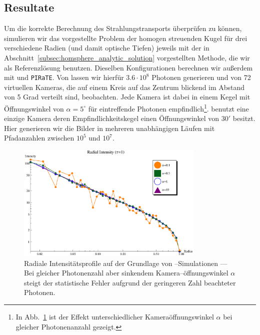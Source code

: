 	\subsection{Resultate}
	Um die korrekte Berechnung des Strahlungstransports überprüfen zu können, simulieren wir das vorgestellte Problem der homogen streuenden Kugel für drei verschiedene Radien (und damit optische Tiefen) jeweils mit der in Abschnitt~\ref{subsec:homsphere_analytic_solution} vorgestellten Methode, die wir als Referenzlösung benutzen. Dieselben Konfigurationen berechnen wir außerdem mit \mctd und \texttt{PIRaTE}. Von \mctd lassen wir hierfür $3.6\cdot10^8$ Photonen generieren und von 72 virtuellen Kameras, die auf einem Kreis auf das Zentrum blickend im Abstand von 5 Grad verteilt sind, beobachten. Jede Kamera ist dabei in einem Kegel mit Öffnungswinkel von $\alpha=5^\circ$ für eintreffende Photonen empfindlich\footnote{In Abb.~\ref{fig:alphacomparison} ist der Effekt unterschiedlicher Kameraöffnungswinkel $\alpha$ bei gleicher Photonenanzahl gezeigt.}. \pirate benutzt eine einzige Kamera deren Empfindlichkeitskegel einen Öffnungswinkel von $30'$ besitzt. Hier generieren wir die Bilder in mehreren unabhängigen Läufen mit Pfadanzahlen zwischen $10^5$ und $10^7$.
	
		\begin{figure}
			\centering
			\includegraphics[width=0.8\textwidth]{mc3dalphasplot.eps}
			\caption{Radiale Intensitätsprofile auf der Grundlage von \mctd--Simulationen --- Bei gleicher Photonenzahl aber sinkendem Kamera--öffnungswinkel $\alpha$ steigt der statistische Fehler aufgrund der geringeren Zahl beachteter Photonen.}
			\label{fig:alphacomparison}
		\end{figure}
		
